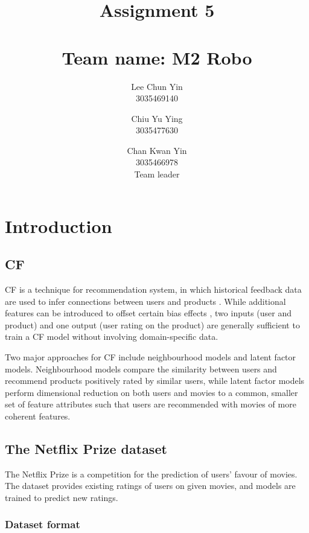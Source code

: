 \documentclass[final]{cvpr}
\begin{document}
\title{
	Assignment 5 \\~\\
	\large{Team name: M2 Robo}
}

\author{
	Lee Chun Yin\\
	3035469140\\
	\and
	Chiu Yu Ying\\
	3035477630
	\and
	Chan Kwan Yin\\
	3035466978 \\
	Team leader
}

\maketitle

\clearpage

\section{Introduction}
\subsection{\ac{CF}}
\ac{CF} is a technique for recommendation system,
in which historical feedback data are used to infer connections between users and products \cite{FactorMeet}.
While additional features can be introduced to offset certain bias effects \cite{BellKor2008},
two inputs (user and product) and one output (user rating on the product) are generally sufficient
to train a \ac{CF} model without involving domain-specific data.

Two major approaches for \ac{CF} include neighbourhood models and latent factor models.
Neighbourhood models compare the similarity between users
and recommend products positively rated by similar users,
while latent factor models perform dimensional reduction on both users and movies
to a common, smaller set of feature attributes such that
users are recommended with movies of more coherent features.

\subsection{The Netflix Prize dataset}
The Netflix Prize is a competition for the prediction of users' favour of movies.
The dataset provides existing ratings of users on given movies,
and models are trained to predict new ratings.

\subsubsection{Dataset format}
\end{document}
